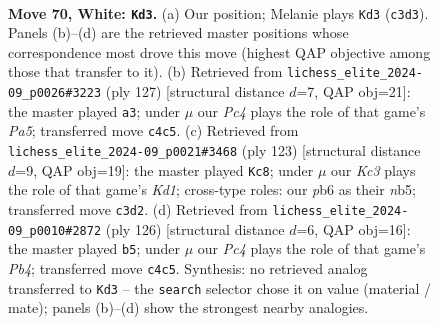 \documentclass[11pt]{article}
\begin{document}
\clearpage

\begin{figure}[p]\centering
\begin{subfigure}{0.46\textwidth}\centering
\resizebox{\linewidth}{!}{%
\newchessgame
\chessboard[
  setfen={8/8/pp6/8/q1P5/2K4k/8/8 w - - 8 70},
  showmover=false,
  pgfstyle=straightmove, color=movearrow, markmove={c3-d3}
]}
\caption{}
\end{subfigure}\hfill
\begin{subfigure}{0.46\textwidth}\centering
\resizebox{\linewidth}{!}{%
\newchessgame
\chessboard[
  setfen={3k4/6P1/2Q2P2/8/p7/8/P6K/8 b - - 0 64},
  showmover=false,
  pgfstyle=straightmove, color=movearrow, markmove={a4-a3}
]}
\caption{}
\end{subfigure}
\\[4pt]
\begin{subfigure}{0.46\textwidth}\centering
\resizebox{\linewidth}{!}{%
\newchessgame
\chessboard[
  setfen={3k4/5Q2/8/1N5p/7P/5K2/8/8 b - - 8 62},
  showmover=false,
  pgfstyle=straightmove, color=movearrow, markmove={d8-c8}
]}
\caption{}
\end{subfigure}\hfill
\begin{subfigure}{0.46\textwidth}\centering
\resizebox{\linewidth}{!}{%
\newchessgame
\chessboard[
  setfen={8/1q4pk/8/5p2/KP6/8/8/8 w - - 0 64},
  showmover=false,
  pgfstyle=straightmove, color=movearrow, markmove={b4-b5}
]}
\caption{}
\end{subfigure}
\caption{\textbf{Move 70, White: \texttt{Kd3}.} (a) Our position; Melanie plays \texttt{Kd3} (\texttt{c3d3}). Panels (b)--(d) are the retrieved master positions whose correspondence most drove this move (highest QAP objective among those that transfer to it). (b) Retrieved from \texttt{lichess\_elite\_2024-09\_p0026\#3223} (ply 127) [structural distance $d$=7, QAP obj=21]: the master played \texttt{a3}; under $\mu$ our \emph{Pc4} plays the role of that game's \emph{Pa5}; transferred move \texttt{c4c5}. (c) Retrieved from \texttt{lichess\_elite\_2024-09\_p0021\#3468} (ply 123) [structural distance $d$=9, QAP obj=19]: the master played \texttt{Kc8}; under $\mu$ our \emph{Kc3} plays the role of that game's \emph{Kd1}; cross-type roles: our \emph{p}b6 as their \emph{n}b5; transferred move \texttt{c3d2}. (d) Retrieved from \texttt{lichess\_elite\_2024-09\_p0010\#2872} (ply 126) [structural distance $d$=6, QAP obj=16]: the master played \texttt{b5}; under $\mu$ our \emph{Pc4} plays the role of that game's \emph{Pb4}; transferred move \texttt{c4c5}. Synthesis: no retrieved analog transferred to \texttt{Kd3} -- the \texttt{search} selector chose it on value (material / mate); panels (b)--(d) show the strongest nearby analogies.}
\label{fig:thought-m138}
\end{figure}
\end{document}
